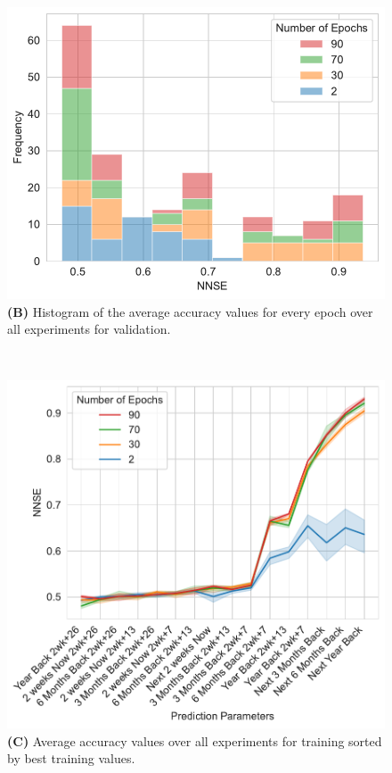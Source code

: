 \documentclass[utf8]{FrontiersinVancouver} %
\begin{document}
\begin{figure}[p]
\begin{center}
\begin{minipage}[t]{0.49\textwidth}
        \includegraphics[width=1.0\linewidth]{images/frequency_nnse_histogram_stacked_df_validation}
        {\bf (B)} Histogram of the average accuracy values for every epoch over all experiments for validation.
     \end{minipage}
  \ \
     \begin{minipage}[t]{0.49\textwidth}
        \includegraphics[width=1.0\linewidth]{images/NNSE-all-epochs-training}
        {\bf (C)} Average accuracy values over all experiments for training sorted by best training values.

\end{minipage}
\end{center}
\end{figure}
\end{document}
